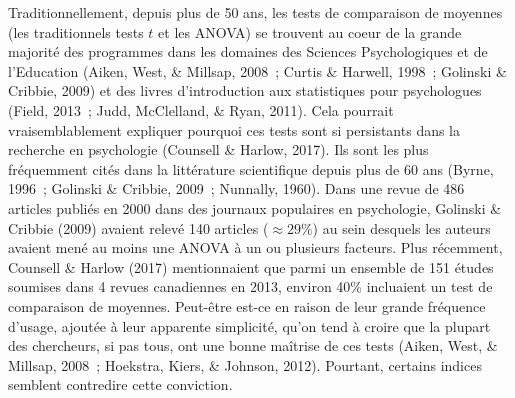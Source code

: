 \documentclass[
  12pt,
  french,
]{article}
\begin{document}
Traditionnellement, depuis plus de 50 ans, les tests de comparaison de
moyennes (les traditionnels tests \(t\) et les ANOVA) se trouvent au
coeur de la grande majorité des programmes dans les domaines des
Sciences Psychologiques et de l'Education (Aiken, West, \& Millsap,
2008~; Curtis \& Harwell, 1998~; Golinski \& Cribbie, 2009) et des
livres d'introduction aux statistiques pour psychologues (Field, 2013~;
Judd, McClelland, \& Ryan, 2011). Cela pourrait vraisemblablement
expliquer pourquoi ces tests sont si persistants dans la recherche en
psychologie (Counsell \& Harlow, 2017). Ils sont les plus fréquemment
cités dans la littérature scientifique depuis plus de 60 ans (Byrne,
1996~; Golinski \& Cribbie, 2009~; Nunnally, 1960). Dans une revue de
486 articles publiés en 2000 dans des journaux populaires en
psychologie,
Golinski \& Cribbie (2009) avaient relevé 140 articles
(\(\approx 29 \%\)) au sein desquels les auteurs avaient mené au moins
une ANOVA à un ou plusieurs facteurs. Plus récemment, Counsell \& Harlow
(2017) mentionnaient que parmi un ensemble de 151 études soumises dans 4
revues canadiennes en 2013, environ 40\% incluaient un test de
comparaison de moyennes. Peut-être est-ce en raison de leur grande
fréquence d'usage, ajoutée à leur apparente simplicité, qu'on tend à
croire que la plupart des chercheurs, si pas tous, ont une bonne
maîtrise de ces tests (Aiken, West, \& Millsap, 2008~; Hoekstra, Kiers,
\& Johnson, 2012). Pourtant, certains indices semblent contredire cette
conviction.
\end{document}
